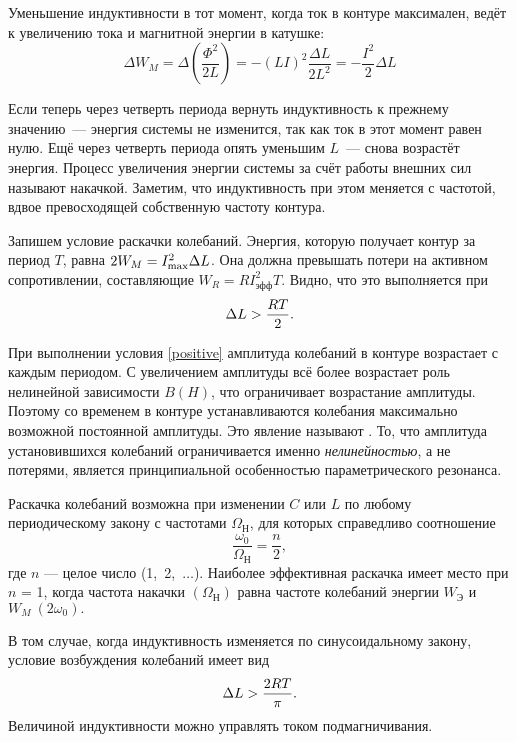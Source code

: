 Уменьшение индуктивности в тот момент, когда ток в контуре максимален, ведёт к
увеличению тока и магнитной энергии в катушке:
\begin{equation*}
	\Delta W_M = \Delta \left(\frac{\Phi^2}{2L}\right) = - (LI)^2\frac{\Delta
L}{2L^2} = - \frac{I^2}{2}\Delta L
\end{equation*}

Если теперь через четверть периода вернуть индуктивность к прежнему значению~---
энергия системы не изменится, так как ток в этот момент равен нулю. Ещё через
четверть периода опять уменьшим $L$~--- снова возрастёт энергия. Процесс
увеличения энергии системы за счёт работы внешних сил называют накачкой.
Заметим, что индуктивность при этом меняется с частотой, вдвое превосходящей
собственную частоту контура.

Запишем условие раскачки колебаний.
Энергия, которую получает контур за период $T$, равна  
$2W_M = I^2_{\rm max} \Delta L$. Она должна превышать потери на активном 
сопротивлении, составляющие $W_R = RI^2_\text{эфф}T$. Видно, что это
выполняется при 
\begin{equation}
\eqmark{positive}
\Delta L > \frac{RT}{2}.
\end{equation}

При выполнении условия \eqref{positive} амплитуда колебаний в
контуре возрастает с каждым периодом. С увеличением амплитуды всё более
возрастает роль нелинейной зависимости $B(H)$, что ограничивает возрастание
амплитуды. Поэтому со временем в контуре устанавливаются колебания максимально
возможной постоянной амплитуды. Это явление называют . То, что амплитуда установившихся колебаний ограничивается именно 
\emph{нелинейностью}, а не потерями, является принципиальной особенностью 
параметрического резонанса.

Раскачка колебаний возможна при изменении $C$ или $L$ по любому периодическому
закону с частотами $\Omega_\text{Н}$, для которых справедливо соотношение
\begin{equation*}
	\frac{\omega_0}{\Omega_\text{Н}} = \frac{n}{2},
\end{equation*}
где $n$ --- целое число (1,~2,~$\dots$). Наиболее эффективная раскачка имеет
место при $n$ = 1, когда частота накачки $(\Omega_\text{Н})$ равна частоте
колебаний энергии $W_\text{Э}$ и $W_M~(2\omega_0).$

 В том случае, когда индуктивность изменяется по синусоидальному закону, условие
возбуждения колебаний имеет вид
\begin{equation}
	\eqmark{4.6.3}
	\Delta L > \frac{2RT}{\pi}.
\end{equation}
Величиной индуктивности можно управлять током подмагничивания.

